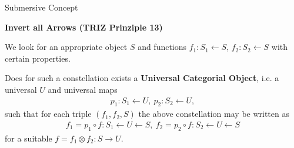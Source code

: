 \documentclass{beamer}
\newcommand{\ueberschrift}[1]{\begin{center}\bf #1\end{center}}
\begin{document}
\begin{frame}{Submersive Concept}

\ueberschrift{Invert all Arrows (TRIZ Prinziple 13)}
\small

We look for an appropriate object $S$ and functions $f_1: S_1 \leftarrow S$,
$f_2: S_2 \leftarrow S$ with certain properties.

Does for such a constellation exists a \textbf{Universal Categorial Object},
i.e. a universal $U$ and universal maps
\begin{gather*}
  p_1: S_1 \leftarrow U,\ p_2: S_2 \leftarrow U,
\end{gather*}
such that for each triple $(f_1, f_2, S)$ the above constellation may be
written as
\begin{gather*}
  f_1 = p_1 \circ f: S_1 \leftarrow U \leftarrow S,\ f_2 = p_2 \circ f : S_2
  \leftarrow U \leftarrow S
\end{gather*}
for a suitable $f = f_1 \otimes f_2: S \rightarrow U$. 

\end{frame}
\end{document}
